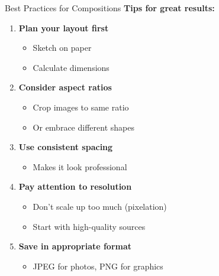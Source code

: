 \documentclass{csbeamer}
\begin{document}
\begin{frame}{Best Practices for Compositions}
    \textbf{Tips for great results:}

    \vspace{1em}

    \begin{enumerate}
        \item \textbf{Plan your layout first}
            \begin{itemize}
                \item Sketch on paper
                \item Calculate dimensions
            \end{itemize}

        \item \textbf{Consider aspect ratios}
            \begin{itemize}
                \item Crop images to same ratio
                \item Or embrace different shapes
            \end{itemize}

        \item \textbf{Use consistent spacing}
            \begin{itemize}
                \item Makes it look professional
            \end{itemize}

        \item \textbf{Pay attention to resolution}
            \begin{itemize}
                \item Don't scale up too much (pixelation)
                \item Start with high-quality sources
            \end{itemize}

        \item \textbf{Save in appropriate format}
            \begin{itemize}
                \item JPEG for photos, PNG for graphics
            \end{itemize}
    \end{enumerate}
\end{frame}
\end{document}
